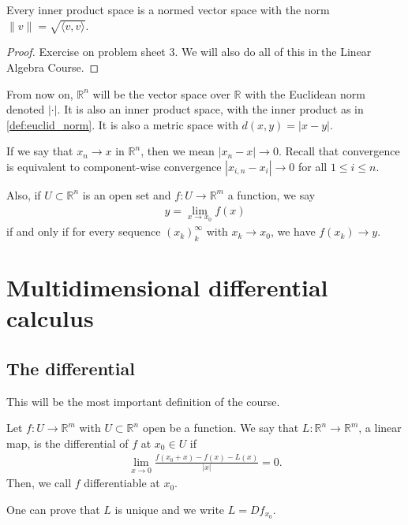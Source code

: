 \begin{prop}\label{prop:inner_prod_induces_norm}
    Every inner product space is a normed vector space with the norm $\lVert v \rVert = \sqrt{\langle v,v \rangle}$.
\end{prop}
\begin{proof}
    Exercise on problem sheet 3. We will also do all of this in the Linear Algebra Course.
\end{proof}

\begin{remark}\label{rem:global_conventions}
    From now on, $\mathbb{R}^{n}$ will be the vector space over $\mathbb{R}$ with the Euclidean norm denoted $\left| \cdot \right|$. It is also an inner product space, with the inner product as in \ref{def:euclid_norm}. It is also a metric space with $d(x,y) = \left| x-y \right|$. 

    If we say that $x_{n} \to x$ in $\mathbb{R}^{n}$, then we mean $\left| x_{n} - x \right| \to 0$. Recall that convergence is equivalent to component-wise convergence $\left| x_{i,n} - x_{i} \right| \to 0$ for all $1 \leq i \leq n$. 

    Also, if $U \subset \mathbb{R}^{n}$ is an open set and $f: U \to \mathbb{R}^{m}$ a function, we say
    \begin{align*}
        y = \lim_{x \to x_{0}} f(x)
    \end{align*}
    if and only if for every sequence $(x_{k})_{k}^{\infty}$ with $x_{k} \to x_{0}$, we have $f(x_{k}) \to y$. 
\end{remark}

\chapter{Multidimensional differential calculus}

\section{The differential}

This will be the most important definition of the course.

\begin{definition}[Differential]\label{def:differential}
    Let $f: U \to \mathbb{R}^{m}$ with $U \subset \mathbb{R}^{n}$ open be a function. We say that $L : \mathbb{R}^{n} \to \mathbb{R}^{m}$, a linear map, is the differential of $f$ at $x_{0} \in U$ if
    \begin{align*}
        \lim_{x \to 0} \frac{f(x_{0}+x) - f(x) - L(x)}{\left| x \right|} = 0.
    \end{align*}
    Then, we call $f$ differentiable at $x_{0}$. 

    One can prove that $L$ is unique and we write $L = Df_{x_{0}}$.
\end{definition}

